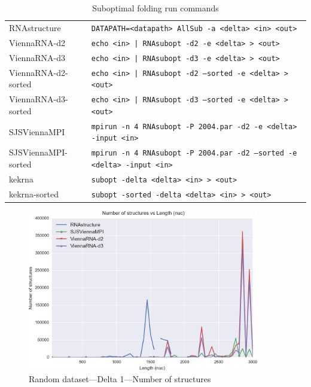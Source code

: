 \documentclass{cshonours}
\begin{document}
\begin{table}
\begin{adjustbox}{center}
\begin{tabular}{lp{10cm}}
RNAstructure &\texttt{DATAPATH=<datapath> AllSub -a <delta> <in> <out>} \\
ViennaRNA-d2 &\texttt{echo <in> | RNAsubopt -d2 -e <delta> > <out>} \\
ViennaRNA-d3 &\texttt{echo <in> | RNAsubopt -d3 -e <delta> > <out>} \\
ViennaRNA-d2-sorted &\texttt{echo <in> | RNAsubopt -d2 --sorted -e <delta> > <out>} \\
ViennaRNA-d3-sorted &\texttt{echo <in> | RNAsubopt -d3 --sorted -e <delta> > <out>} \\
SJSViennaMPI &\texttt{mpirun -n 4 RNAsubopt -P 2004.par -d2 -e <delta> -input <in>} \\
SJSViennaMPI-sorted &\texttt{mpirun -n 4 RNAsubopt -P 2004.par -d2 --sorted -e <delta> -input <in>} \\
kekrna & \texttt{subopt -delta <delta> <in> > <out>} \\
kekrna-sorted & \texttt{subopt -sorted -delta <delta> <in> > <out>} \\
\end{tabular}
\end{adjustbox}
\caption{Suboptimal folding run commands}
\label{table:suboptimal_run_commands}
\end{table}

\begin{figure}[p]
\centering
\includegraphics[width=0.9\textwidth]{res/subopt_1_numstruc.png}
\caption{Random dataset---Delta 1---Number of structures}
\label{fig:subopt_1_numstruc}
\end{figure}
\end{document}
